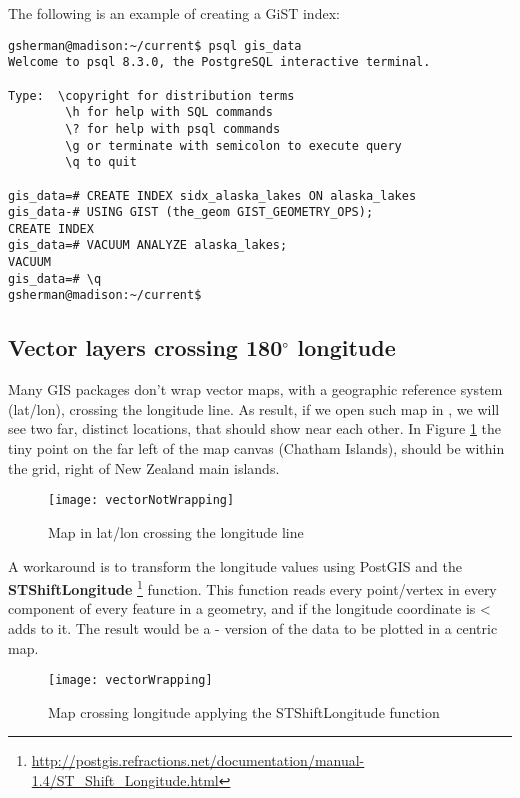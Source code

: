 The following is an example of creating a GiST index:
\begin{verbatim}
gsherman@madison:~/current$ psql gis_data
Welcome to psql 8.3.0, the PostgreSQL interactive terminal.

Type:  \copyright for distribution terms
        \h for help with SQL commands
        \? for help with psql commands
        \g or terminate with semicolon to execute query
        \q to quit

gis_data=# CREATE INDEX sidx_alaska_lakes ON alaska_lakes
gis_data-# USING GIST (the_geom GIST_GEOMETRY_OPS);
CREATE INDEX
gis_data=# VACUUM ANALYZE alaska_lakes;
VACUUM
gis_data=# \q
gsherman@madison:~/current$
\end{verbatim}

\subsection{Vector layers crossing 180$^\circ$ longitude}

Many GIS packages don't wrap vector maps, with a geographic reference system
(lat/lon), crossing the  longitude line. As result, if
we open such map in \qg, we will see two far, distinct locations, that
should show near each other. In Figure \ref{fig:vector_not_wrapping} the tiny
point on the far left of the map canvas (Chatham Islands), should be within
the grid, right of New Zealand main islands.

\begin{figure}[ht]
   \centering
   \texttt{[image: vectorNotWrapping]}
      \caption{Map in lat/lon crossing the  longitude line \nixcaption}
   \label{fig:vector_not_wrapping}
\end{figure}

A workaround is to transform the longitude values using PostGIS and the
\textbf{ST\textunderscore Shift\textunderscore Longitude}
\footnote{\url{http://postgis.refractions.net/documentation/manual-1.4/ST_Shift_Longitude.html}}
function. This function reads every point/vertex in every component of every
feature in a geometry, and if the longitude coordinate is <  adds
 to it. The result would be a  -  version of
the data to be plotted in a  centric map.

\begin{figure}[ht]
   \centering
   \texttt{[image: vectorWrapping]}
   \caption{Map crossing  longitude applying the ST\textunderscore Shift\textunderscore Longitude function \nixcaption}
\label{fig:vector_wrapping}   
\end{figure}

